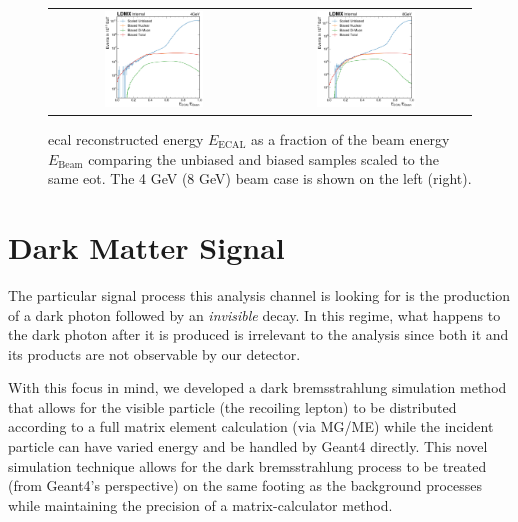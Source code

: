 \begin{figure}
  \centering
  \begin{tabular}{cc}
    \includegraphics[width=0.49\textwidth]{figures/ldmx/simulation/unbiased-biased-comp-4gev.pdf}
    &
    \includegraphics[width=0.49\textwidth]{figures/ldmx/simulation/unbiased-biased-comp-8gev.pdf}
  \end{tabular}
  \caption{\ac{ecal} reconstructed energy $E_\text{ECAL}$ as a fraction of the beam energy
  $E_\text{Beam}$ comparing the unbiased and biased samples scaled to the same \ac{eot}.
  The 4 GeV (8 GeV) beam case is shown on the left (right).}
  \label{fig:unbiased-biased-comp}
\end{figure}

\section{Dark Matter Signal}
The particular signal process this analysis channel is looking for is the production of a dark
photon followed by an \emph{invisible} decay. In this regime, what happens to the dark photon after
it is produced is irrelevant to the analysis since both it and its products are not observable by
our detector.

With this focus in mind, we developed a dark bremsstrahlung simulation method that allows for the
visible particle (the recoiling lepton) to be distributed according to a full matrix element
calculation (via MG/ME) while the incident particle can have varied energy and be handled by Geant4
directly. This novel simulation technique allows for the dark bremsstrahlung process to be treated
(from Geant4's perspective) on the same footing as the background processes while maintaining the
precision of a matrix-calculator method.

